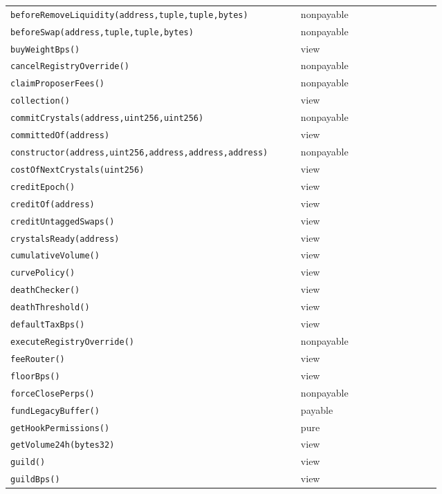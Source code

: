 \begin{longtable}{@{}p{0.62\linewidth}p{0.30\linewidth}@{}}
\texttt{\scriptsize beforeRemoveLiquidity(address,tuple,tuple,bytes)} & nonpayable \\
\texttt{\scriptsize beforeSwap(address,tuple,tuple,bytes)} & nonpayable \\
\texttt{\scriptsize buyWeightBps()} & view \\
\texttt{\scriptsize cancelRegistryOverride()} & nonpayable \\
\texttt{\scriptsize claimProposerFees()} & nonpayable \\
\texttt{\scriptsize collection()} & view \\
\texttt{\scriptsize commitCrystals(address,uint256,uint256)} & nonpayable \\
\texttt{\scriptsize committedOf(address)} & view \\
\texttt{\scriptsize constructor(address,uint256,address,address,address)} & nonpayable \\
\texttt{\scriptsize costOfNextCrystals(uint256)} & view \\
\texttt{\scriptsize creditEpoch()} & view \\
\texttt{\scriptsize creditOf(address)} & view \\
\texttt{\scriptsize creditUntaggedSwaps()} & view \\
\texttt{\scriptsize crystalsReady(address)} & view \\
\texttt{\scriptsize cumulativeVolume()} & view \\
\texttt{\scriptsize curvePolicy()} & view \\
\texttt{\scriptsize deathChecker()} & view \\
\texttt{\scriptsize deathThreshold()} & view \\
\texttt{\scriptsize defaultTaxBps()} & view \\
\texttt{\scriptsize executeRegistryOverride()} & nonpayable \\
\texttt{\scriptsize feeRouter()} & view \\
\texttt{\scriptsize floorBps()} & view \\
\texttt{\scriptsize forceClosePerps()} & nonpayable \\
\texttt{\scriptsize fundLegacyBuffer()} & payable \\
\texttt{\scriptsize getHookPermissions()} & pure \\
\texttt{\scriptsize getVolume24h(bytes32)} & view \\
\texttt{\scriptsize guild()} & view \\
\texttt{\scriptsize guildBps()} & view \\

\end{longtable}
